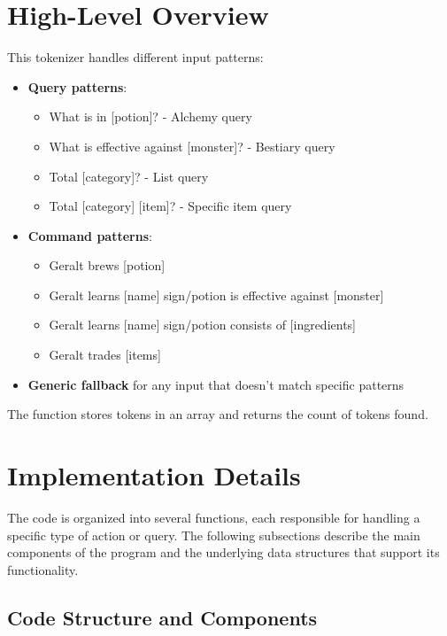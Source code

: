\documentclass{article}
\begin{document}
\section*{High-Level Overview}

This tokenizer handles different input patterns:

\begin{itemize}
    \item \textbf{Query patterns}:
    \begin{itemize}
        \item What is in [potion]? - Alchemy query
        \item What is effective against [monster]? - Bestiary query
        \item Total [category]? - List query
        \item Total [category] [item]? - Specific item query
    \end{itemize}
    
    \item \textbf{Command patterns}:
    \begin{itemize}
        \item Geralt brews [potion]
        \item Geralt learns [name] sign/potion is effective against [monster]
        \item Geralt learns [name] sign/potion consists of [ingredients]
        \item Geralt trades [items]
    \end{itemize}
    
    \item \textbf{Generic fallback} for any input that doesn't match specific patterns
\end{itemize}

The function stores tokens in an array and returns the count of tokens found.

\section{Implementation Details}

The code is organized into several functions, each responsible for handling a specific type of action or query. The following subsections describe the main components of the program and the underlying data structures that support its functionality.

\subsection{Code Structure and Components}
\end{document}
